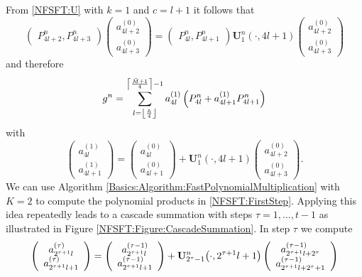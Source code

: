 From \eqref{NFSFT:U} with $k = 1$ and $c = l+1$ it follows that
\[
\left(\begin{array}{c}
  P_{4l+2}^{n}, 
  P_{4l+3}^{n}
\end{array}\right)
\left(\begin{array}{c}
  a_{4l+2}^{(0)}\\
  a_{4l+3}^{(0)} 
\end{array}\right)
=
\left(\begin{array}{c}
  P_{4l}^{n},
  P_{4l+1}^{n}
\end{array}\right)
{\mathbf{U}_{1}^{n}\left(\cdot,4l+1\right)}
\left(\begin{array}{c}
  a_{4l+2}^{(0)}\\
  a_{4l+3}^{(0)} 
\end{array}\right)
\]
and therefore
\[ g^n = \sum_{l = \left\lfloor\frac{\tilde{n}}{4}\right\rfloor}^{\left\lceil\frac{\tilde{M}+1}{4}\right\rceil-1} a_{4l}^{(1)} \left(P_{4l}^{n} + a_{4l+1}^{(1)} P_{4l+1}^{n}\right) \]
with
\begin{equation}
\label{NFSFT:FirstStep}
  \left(\begin{array}{c}
    a_{4l}^{(1)}\\
    a_{4l+1}^{(1)} 
  \end{array}\right)
  =
  \left(\begin{array}{c}
    a_{4l}^{(0)}\\
    a_{4l+1}^{(0)} 
  \end{array}\right)
  + {\mathbf{U}_{1}^{n}\left(\cdot,4l+1\right)}
  \left(\begin{array}{c}
    a_{4l+2}^{(0)}\\
    a_{4l+3}^{(0)} 
  \end{array}\right).
\end{equation}
We can use Algorithm \ref{Basics:Algorithm:FastPolynomialMultiplication} with $K=2$ to compute 
the polynomial products in \eqref{NFSFT:FirstStep}. Applying this idea repeatedly leads to a cascade 
summation with steps $\tau=1,\ldots,t-1$ as illustrated in Figure \ref{NFSFT:Figure:CascadeSummation}. 
In step $\tau$ we compute
\begin{equation}
  \label{NFSFT:GeneralStep}
  \left(\begin{array}{c}
    a_{2^{\tau+1}l}^{(\tau)}\\
    a_{2^{\tau+1}l+1}^{(\tau)} 
  \end{array}\right)
  =
  \left(\begin{array}{c}
    a_{2^{\tau+1}l}^{(\tau-1)}\\
    a_{2^{\tau+1}l+1}^{(\tau-1)} 
  \end{array}\right)
  + {\mathbf{U}_{2^{\tau}-1}^{n}{\hspace{-0.4ex}}\left(\cdot,2^{\tau+1}l+1\right)}
  \left(\begin{array}{c}
    a_{2^{\tau+1}l+2^{\tau}}^{(\tau-1)}\\
    a_{2^{\tau+1}l+2^{\tau}+1}^{(\tau-1)} 
  \end{array}\right)
\end{equation}
